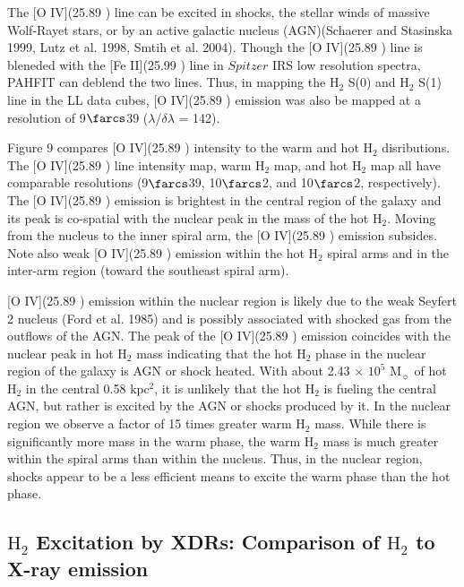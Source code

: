 \documentclass[manuscript]{aastex}
\begin{document}
The [O IV](25.89 \micron) line can be excited in shocks, the stellar winds of massive Wolf-Rayet stars, or by an active galactic nucleus (AGN)(Schaerer and Stasinska 1999, Lutz et al. 1998, Smtih et al. 2004).  Though the [O IV](25.89 \micron) line is bleneded with the [Fe II](25.99 \micron) line in $Spitzer$ IRS low resolution spectra, PAHFIT can deblend the two lines.  Thus, in mapping the $\mathrm{H_2}$ S(0) and $\mathrm{H_2}$ S(1) line in the LL data cubes, [O IV](25.89 \micron) emission was also be mapped at a resolution of 9$\farcs$39 ($\lambda$/$\delta$$\lambda$ = 142). 

Figure 9 compares [O IV](25.89 \micron) intensity to the warm and hot $\mathrm{H_2}$ disributions.  The [O IV](25.89 \micron) line intensity map, warm $\mathrm{H_2}$ map, and hot $\mathrm{H_2}$ map all have comparable resolutions (9$\farcs$39, 10$\farcs$2, and 10$\farcs$2, respectively).  The [O IV](25.89 \micron) emission is brightest in the central region of the galaxy and its peak is co-spatial with the nuclear peak in the mass of the hot $\mathrm{H_2}$.  Moving from the nucleus to the inner spiral arm, the [O IV](25.89 \micron) emission subsides.  Note also weak [O IV](25.89 \micron) emission within the hot $\mathrm{H_2}$ spiral arms and in the inter-arm region (toward the southeast spiral arm).

[O IV](25.89 \micron) emission within the nuclear region is likely due to the weak Seyfert 2 nucleus (Ford et al. 1985) and is possibly associated with shocked gas from the outflows of the AGN.  The peak of the [O IV](25.89 \micron) emission coincides with the nuclear peak in hot $\mathrm{H_2}$ mass indicating that the hot $\mathrm{H_2}$ phase in the nuclear region of the galaxy is AGN or shock heated.  With about 2.43 $\times$ $\mathrm{10^5}$ $\mathrm{M_\sun}$ of hot $\mathrm{H_2}$ in the central 0.58 $\mathrm{kpc^2}$, it is unlikely that the hot $\mathrm{H_2}$ is fueling the central AGN, but rather is excited by the AGN or shocks produced by it.  In the nuclear region we observe a factor of 15 times greater warm $\mathrm{H_2}$ mass.  While there is significantly more mass in the warm phase, the warm $\mathrm{H_2}$ mass is much greater within the spiral arms than within the nucleus.  Thus, in the nuclear region, shocks appear to be a less efficient means to excite the warm phase than the hot phase.


\subsection{$\mathrm{H_2}$ Excitation by XDRs: Comparison of $\mathrm{H_2}$ to X-ray emission}
\end{document}
